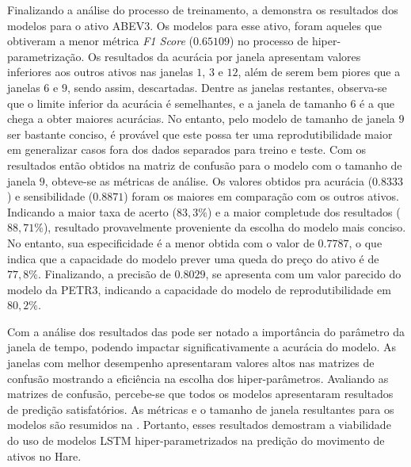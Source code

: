 
Finalizando a análise do processo de treinamento, a  demonstra os resultados dos modelos para o ativo ABEV3. Os modelos para esse ativo, foram aqueles que obtiveram a menor métrica \emph{F1 Score} ($0.65109$) no processo de hiper-parametrização. Os resultados da acurácia por janela apresentam valores inferiores aos outros ativos nas janelas $1$, $3$ e $12$, além de serem bem piores que a janelas $6$ e $9$, sendo assim, descartadas. Dentre as janelas restantes, observa-se que o limite inferior da acurácia 
é semelhantes, e a janela de tamanho $6$ é a que chega a obter maiores acurácias. No entanto, pelo modelo de tamanho de janela $9$ ser bastante conciso, é provável que este possa ter uma reprodutibilidade maior em generalizar casos fora dos dados separados para treino e teste. Com os resultados então obtidos na matriz de confusão para o modelo com o tamanho de janela $9$, obteve-se as métricas de análise. Os valores obtidos pra acurácia ($0.8333$) e sensibilidade ($0.8871$) foram os maiores em comparação com os outros ativos. Indicando a maior taxa de acerto ($83,3\%$) e a maior completude dos resultados ($88,71\%$), resultado provavelmente proveniente da escolha do modelo mais conciso. No entanto, sua especificidade é a menor obtida com o valor de $0.7787$, o que indica que a capacidade do modelo prever uma queda do preço do ativo é de $77,8\%$. Finalizando, a precisão de $0.8029$, se apresenta com um valor parecido do modelo da PETR3, indicando a capacidade do modelo de reprodutibilidade em $80,2\%$.



Com a análise dos resultados das  pode ser notado a importância do parâmetro da janela de tempo, podendo impactar significativamente a acurácia do modelo. As janelas com melhor desempenho apresentaram valores altos nas matrizes de confusão mostrando a eficiência na escolha dos hiper-parâmetros. Avaliando as matrizes de confusão, percebe-se que todos os modelos apresentaram resultados de predição satisfatórios. As métricas e o tamanho de janela resultantes para os modelos são resumidos na . Portanto, esses resultados demostram a viabilidade do uso de modelos \acrshort{LSTM} hiper-parametrizados na predição do movimento de ativos no Hare.

